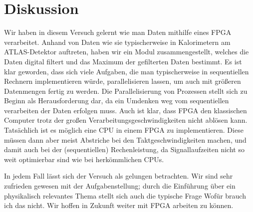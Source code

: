 \section{Diskussion}
Wir haben in diesem Versuch gelernt wie man Daten mithilfe eines FPGA verarbeitet.
Anhand von Daten wie sie typischerweise in Kalorimetern am ATLAS-Detektor auftreten, haben wir ein Modul zusammengestellt, welches die Daten digital filtert und das Maximum der gefilterten Daten bestimmt.
Es ist klar geworden, dass sich viele Aufgaben, die man typischerweise in sequentiellen Rechnern implementieren würde, parallelisieren lassen, um auch mit größeren Datenmengen fertig zu werden.
Die Parallelisierung von Prozessen stellt sich zu Beginn als Herausforderung dar, da ein Umdenken weg vom sequentiellen verarbeiten der Daten erfolgen muss.
Auch ist klar, dass FPGA den klassischen Computer trotz der großen Verarbeitungsgeschwindigkeiten nicht ablösen kann.
Tatsächlich ist es möglich eine CPU in einem FPGA zu implementieren.
Diese müssen dann aber meist Abstriche bei den Taktgeschwindigkeiten machen, und damit auch bei der (sequentiellen) Rechenleistung, da Signallaufzeiten nicht so weit optimierbar sind wie bei herkömmlichen CPUs.

In jedem Fall lässt sich der Versuch als gelungen betrachten.
Wir sind sehr zufrieden gewesen mit der Aufgabenstellung; durch die Einführung über ein physikalisch relevantes Thema stellt sich auch die typische Frage \glqq Wofür brauch ich das\grqq{} nicht.
Wir hoffen in Zukunft weiter mit FPGA arbeiten zu können.
